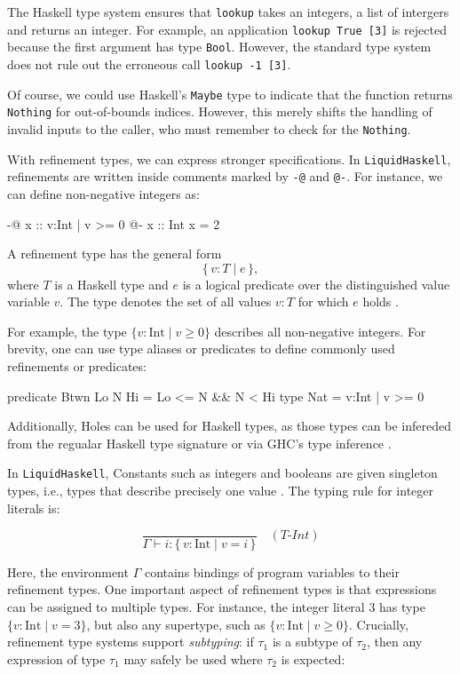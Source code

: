 The Haskell type system ensures that \texttt{lookup} takes an integers, a list of intergers and
returns an integer. For example, an application \texttt{lookup True [3]} is rejected
because the first argument has type \texttt{Bool}. However, the standard type
system does not rule out the erroneous call \texttt{lookup -1 [3]}.

Of course, we could use Haskell's \texttt{Maybe} type to indicate that the function
returns \texttt{Nothing} for out-of-bounds indices. However, this merely shifts the
handling of invalid inputs to the caller, who must remember to check for the \texttt{Nothing}.


With refinement types, we can express stronger specifications. In
\texttt{LiquidHaskell}, refinements are written inside comments marked by
\texttt{-@} and \texttt{@-}. For instance, we can define non-negative integers as:

\begin{code}
	{-@ x :: {v:Int | v >= 0} @-}
	x :: Int
	x = 2
\end{code}

A refinement type has the general form
\[
	\{\, v:T \mid e \,\},
\]
where \(T\) is a Haskell type and \(e\) is a logical predicate over the
distinguished value variable \(v\). The type denotes the set of all values
\(v:T\) for which \(e\) holds \cite{vazou2014}.

For example, the type \(\{ v:\mathrm{Int} \mid v \geq 0 \}\) describes all
non-negative integers.
For brevity, one can use type aliases or predicates to define commonly used refinements or predicates:

\begin{code}
	predicate Btwn Lo N Hi = Lo <= N && N < Hi
	type Nat =  {v:Int | v >= 0}
\end{code}
Additionally, Holes can be used for Haskell types, as those types can be infereded from the
regualar Haskell type signature or via GHC's type inference \cite{vazou_liquidhaskell_2014}.

In \texttt{LiquidHaskell}, Constants such as integers and booleans are given
singleton types, i.e., types that describe precisely one value
\cite{niki_lecture_2024}. The typing rule for integer literals is:

\[
	\frac{}{ \Gamma \vdash i : \{\,v:\mathrm{Int} \mid v = i \,\} }
	\quad (\mathit{T\text{-}Int})
\]

Here, the environment \(\Gamma\) contains bindings of program variables to
their refinement types.
One important aspect of refinement types is that expressions can be assigned
to multiple types. For instance, the integer literal \(3\) has type \(\{ v:\mathrm{Int} \mid v = 3 \}\), but also
any supertype, such as \(\{ v:\mathrm{Int} \mid v \geq 0 \}\).
Crucially, refinement type systems support
\emph{subtyping}: if \(\tau_1\) is a subtype of \(\tau_2\), then any expression
of type \(\tau_1\) may safely be used where \(\tau_2\) is expected:

